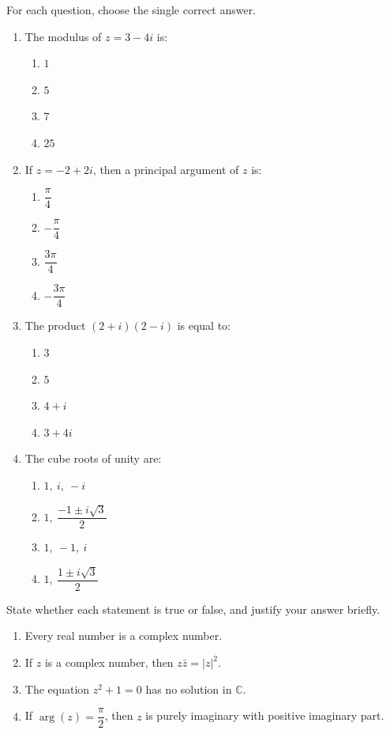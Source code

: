 \documentclass[11pt]{article}
\begin{document}
\begin{exercice}
For each question, choose the single correct answer.
\begin{enumerate}
\item The modulus of $z = 3 - 4i$ is:
\begin{enumerate}
\item $1$ \item $5$ \item $7$ \item $25$
\end{enumerate}
\item If $z = -2 + 2i$, then a principal argument of $z$ is:
\begin{enumerate}
\item $\dfrac{\pi}{4}$ \item $-\dfrac{\pi}{4}$ \item $\dfrac{3\pi}{4}$ \item $-\dfrac{3\pi}{4}$
\end{enumerate}
\item The product $(2 + i)(2 - i)$ is equal to:
\begin{enumerate}
\item $3$ \item $5$ \item $4 + i$ \item $3 + 4i$
\end{enumerate}
\item The cube roots of unity are:
\begin{enumerate}
\item $1,\ i,\ -i$ \item $1,\ \dfrac{-1 \pm i\sqrt{3}}{2}$ \item $1,\ -1,\ i$ \item $1,\ \dfrac{1 \pm i\sqrt{3}}{2}$
\end{enumerate}
\end{enumerate}
\end{exercice}

\begin{exercice}
State whether each statement is true or false, and justify your answer briefly.
\begin{enumerate}
\item Every real number is a complex number.
\item If $z$ is a complex number, then $z\bar{z} = |z|^2$.
\item The equation $z^2 + 1 = 0$ has no solution in $\mathbb{C}$.
\item If $\arg(z) = \dfrac{\pi}{2}$, then $z$ is purely imaginary with positive imaginary part.
\end{enumerate}
\end{exercice}
\end{document}
